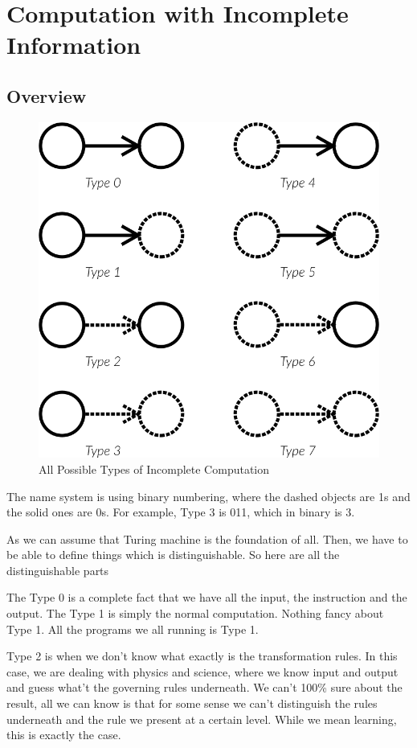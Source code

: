 \section{Computation with Incomplete Information}
\subsection{Overview}
\begin{figure}
  \includegraphics[width=\linewidth]{img/types.png}
  \caption{All Possible Types of Incomplete Computation}
  \label{fig:types}
\end{figure}

The name system is using binary numbering, where the dashed objects are 1s and the solid ones are 0s. For example, Type 3 is 011, which in binary is 3.

As we can assume that Turing machine is the foundation of all. Then, we have to be able to define things which is distinguishable. So here are all the distinguishable parts

The Type 0 is a complete fact that we have all the input, the instruction and the output. The Type 1 is simply the normal computation. Nothing fancy about Type 1. All the programs we all running is Type 1.

Type 2 is when we don't know what exactly is the transformation rules. In this case, we are dealing with physics and science, where we know input and output and guess what't the governing rules underneath. We can't 100\% sure about the result, all we can know is that for some sense we can't distinguish the rules underneath and the rule we present at a certain level. While we mean learning, this is exactly the case.

